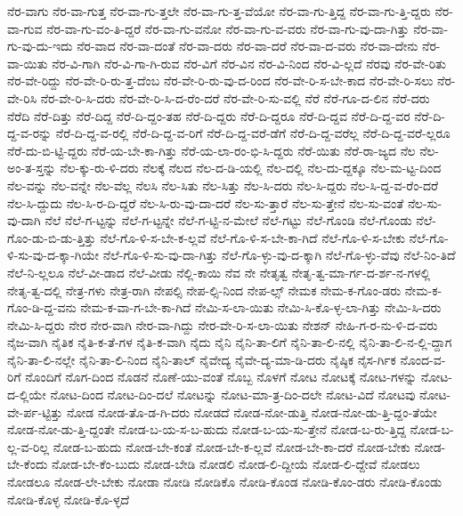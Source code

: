 {ನೆರ-ವಾಗು
ನೆರ-ವಾ-ಗುತ್ತ
ನೆರ-ವಾ-ಗು-ತ್ತಲೇ
ನೆರ-ವಾ-ಗು-ತ್ತ-ವೆಯೋ
ನೆರ-ವಾ-ಗು-ತ್ತಿದ್ದ
ನೆರ-ವಾ-ಗು-ತ್ತಿ-ದ್ದರು
ನೆರ-ವಾ-ಗುವ
ನೆರ-ವಾ-ಗು-ವಂ-ತಿ-ದ್ದರೆ
ನೆರ-ವಾ-ಗು-ವನೋ
ನೆರ-ವಾ-ಗು-ವ-ವರು
ನೆರ-ವಾ-ಗು-ವು-ದಾ-ಗಿತ್ತು
ನೆರ-ವಾ-ಗು-ವು-ದು-ಇದು
ನೆರ-ವಾದ
ನೆರ-ವಾ-ದಂತೆ
ನೆರ-ವಾ-ದರು
ನೆರ-ವಾ-ದರೆ
ನೆರ-ವಾ-ದ-ವರು
ನೆರ-ವಾ-ದೇನು
ನೆರ-ವಾ-ಯಿತು
ನೆರ-ವಿ-ಗಾಗಿ
ನೆರ-ವಿ-ಗಾ-ಗಿ-ರುವ
ನೆರ-ವಿಗೆ
ನೆರ-ವಿನ
ನೆರ-ವಿ-ನಿಂದ
ನೆರ-ವಿ-ಲ್ಲದೆ
ನೆರವು
ನೆರ-ವೇ-ರಿತು
ನೆರ-ವೇ-ರಿದ್ದು
ನೆರ-ವೇ-ರಿ-ರು-ತ್ತ-ದೆಂಬ
ನೆರ-ವೇ-ರಿ-ರು-ವು-ದ-ರಿಂದ
ನೆರ-ವೇ-ರಿ-ಸ-ಬೇ-ಕಾದ
ನೆರ-ವೇ-ರಿ-ಸಲು
ನೆರ-ವೇ-ರಿಸಿ
ನೆರ-ವೇ-ರಿ-ಸಿ-ದರು
ನೆರ-ವೇ-ರಿ-ಸಿ-ದ-ರೆಂ-ದರೆ
ನೆರ-ವೇ-ರಿ-ಸು-ವಲ್ಲಿ
ನೆರೆ
ನೆರೆ-ಗೂ-ದ-ಲಿನ
ನೆರೆ-ದರು
ನೆರೆದಿ
ನೆರೆ-ದಿತ್ತು
ನೆರೆ-ದಿದ್ದ
ನೆರೆ-ದಿ-ದ್ದಂ-ತಹ
ನೆರೆ-ದಿ-ದ್ದರು
ನೆರೆ-ದಿ-ದ್ದರೂ
ನೆರೆ-ದಿ-ದ್ದವ
ನೆರೆ-ದಿ-ದ್ದ-ವರ
ನೆರೆ-ದಿ-ದ್ದ-ವ-ರನ್ನು
ನೆರೆ-ದಿ-ದ್ದ-ವ-ರಲ್ಲಿ
ನೆರೆ-ದಿ-ದ್ದ-ವ-ರಿಗೆ
ನೆರೆ-ದಿ-ದ್ದ-ವರೆ-ಡೆಗೆ
ನೆರೆ-ದಿ-ದ್ದ-ವರೆಲ್ಲ
ನೆರೆ-ದಿ-ದ್ದ-ವರೆ-ಲ್ಲರೂ
ನೆರೆ-ದು-ಬಿ-ಟ್ಟಿ-ದ್ದರು
ನೆರೆ-ಯ-ಬೇ-ಕಾ-ಗಿತ್ತು
ನೆರೆ-ಯ-ಲಾ-ರಂ-ಭಿ-ಸಿ-ದ್ದರು
ನೆರೆ-ಯಿತು
ನೆರೆ-ರಾ-ಜ್ಯದ
ನೆಲ
ನೆಲ-ಅಂ-ತ-ಸ್ತನ್ನು
ನೆಲ-ಕ್ಕು-ರು-ಳಿ-ದರು
ನೆಲಕ್ಕೆ
ನೆಲದ
ನೆಲ-ದ-ಡಿ-ಯಲ್ಲಿ
ನೆಲ-ದಲ್ಲಿ
ನೆಲ-ದು-ದ್ದಕ್ಕೂ
ನೆಲ-ಮ-ಟ್ಟ-ದಿಂದ
ನೆಲ-ವನ್ನು
ನೆಲ-ವನ್ನೇ
ನೆಲ-ವೆಲ್ಲ
ನೆಲಸಿ
ನೆಲ-ಸಿತು
ನೆಲ-ಸಿತ್ತು
ನೆಲ-ಸಿ-ದರು
ನೆಲ-ಸಿ-ದ್ದರು
ನೆಲ-ಸಿ-ದ್ದ-ವ-ರೆಂ-ದರೆ
ನೆಲ-ಸಿ-ದ್ದುದು
ನೆಲ-ಸಿ-ರ-ದಿ-ದ್ದರೆ
ನೆಲ-ಸಿ-ರು-ವು-ದಾ-ದರೆ
ನೆಲ-ಸು-ತ್ತಾರೆ
ನೆಲ-ಸು-ತ್ತೇನೆ
ನೆಲ-ಸು-ವಂತೆ
ನೆಲ-ಸು-ವು-ದಾಗಿ
ನೆಲೆ
ನೆಲೆ-ಗ-ಟ್ಟನ್ನು
ನೆಲೆ-ಗ-ಟ್ಟನ್ನೇ
ನೆಲೆ-ಗ-ಟ್ಟಿ-ನ-ಮೇಲೆ
ನೆಲೆ-ಗಟ್ಟು
ನೆಲೆ-ಗೊಂಡಿ
ನೆಲೆ-ಗೊಂಡು
ನೆಲೆ-ಗೊಂ-ಡು-ಬಿ-ಡು-ತ್ತಿತ್ತು
ನೆಲೆ-ಗೊ-ಳಿ-ಸ-ಬೇ-ಕ-ಲ್ಲವೆ
ನೆಲೆ-ಗೊ-ಳಿ-ಸ-ಬೇ-ಕಾ-ಗಿದೆ
ನೆಲೆ-ಗೊ-ಳಿ-ಸ-ಬೇಕು
ನೆಲೆ-ಗೊ-ಳಿ-ಸು-ವು-ದ-ಕ್ಕಾ-ಗಿಯೇ
ನೆಲೆ-ಗೊ-ಳಿ-ಸು-ವು-ದಾ-ಗಿತ್ತು
ನೆಲೆ-ಗೊ-ಳ್ಳು-ವು-ದ-ಕ್ಕಾಗಿ
ನೆಲೆ-ಗೊ-ಳ್ಳು-ವೆವು
ನೆಲೆ-ನಿಂ-ತಿದೆ
ನೆಲೆ-ನಿ-ಲ್ಲಲೂ
ನೆಲೆ-ವೀ-ಡಾದ
ನೆಲೆ-ವೀಡು
ನೆಲ್ಲಿ-ಕಾಯಿ
ನೆವ
ನೇ
ನೇತೃತ್ವ
ನೇತೃ-ತ್ವ-ಮಾ-ರ್ಗ-ದ-ರ್ಶ-ನ-ಗಳಲ್ಲಿ
ನೇತೃ-ತ್ವ-ದಲ್ಲಿ
ನೇತ್ರ-ಗಳು
ನೇತ್ರ-ರಾಗಿ
ನೇಪಲ್ಸಿ
ನೇಪ-ಲ್ಸಿ-ನಿಂದ
ನೇಪ-ಲ್ಸ್
ನೇಮಕ
ನೇಮ-ಕ-ಗೊಂ-ಡರು
ನೇಮ-ಕ-ಗೊಂ-ಡಿ-ದ್ದ-ವನು
ನೇಮ-ಕ-ವಾ-ಗ-ಬೇ-ಕಾ-ಗಿದೆ
ನೇಮಿ-ಸ-ಲಾ-ಯಿತು
ನೇಮಿ-ಸಿ-ಕೊ-ಳ್ಳ-ಲಾ-ಗಿತ್ತು
ನೇಮಿ-ಸಿ-ದರು
ನೇಮಿ-ಸಿ-ದ್ದರು
ನೇರ
ನೇರ-ವಾಗಿ
ನೇರ-ವಾ-ಗಿದ್ದು
ನೇರ-ವೇ-ರಿ-ಸ-ಲಾ-ಯಿತು
ನೇಶನ್
ನೇಹಿ-ಗ-ರ-ನು-ಳಿ-ದ-ವರು
ನೈಜ-ವಾಗಿ
ನೈತಿಕ
ನೈತಿ-ಕ-ತೆ-ಗಳ
ನೈತಿ-ಕ-ವಾಗಿ
ನೈದು
ನೈನಿ
ನೈನಿ-ತಾ-ಲಿಗೆ
ನೈನಿ-ತಾ-ಲಿ-ನಲ್ಲಿ
ನೈನಿ-ತಾ-ಲಿ-ನ-ಲ್ಲಿ-ದ್ದಾಗ
ನೈನಿ-ತಾ-ಲಿ-ನಲ್ಲೇ
ನೈನಿ-ತಾ-ಲಿ-ನಿಂದ
ನೈನಿ-ತಾಲ್
ನೈವೇದ್ಯ
ನೈವೇ-ದ್ಯ-ಮಾ-ಡಿ-ದರು
ನೈಷ್ಠಿಕ
ನೈಸ-ರ್ಗಿಕ
ನೊಂದ-ವ-ರಿಗೆ
ನೊಂದಿಗೆ
ನೊಗ-ದಿಂದ
ನೊಡನೆ
ನೊಣೆ-ಯು-ವಂತೆ
ನೊಬ್ಬ
ನೊಳಗೆ
ನೋಟ
ನೋಟಕ್ಕೆ
ನೋಟ-ಗಳನ್ನು
ನೋಟ-ದ-ಲ್ಲಿಯೇ
ನೋಟ-ದಿಂದ
ನೋಟ-ದಿಂ-ದಲೆ
ನೋಟನ್ನು
ನೋಟ-ಮಾ-ತ್ರ-ದಿಂ-ದಲೇ
ನೋಟ-ವಿದೆ
ನೋಟವು
ನೋಟ-ವೇ-ರ್ಪ-ಟ್ಟಿತ್ತು
ನೋಡ
ನೋಡ-ತೊ-ಡ-ಗಿ-ದರು
ನೋಡದೆ
ನೋಡ-ನೋ-ಡುತ್ತಿ
ನೋಡ-ನೋ-ಡು-ತ್ತಿ-ದ್ದಂ-ತೆಯೇ
ನೋಡ-ನೋ-ಡು-ತ್ತಿ-ದ್ದಂತೇ
ನೋಡ-ಬ-ಯ-ಸ-ಬ-ಹುದು
ನೋಡ-ಬ-ಯ-ಸು-ತ್ತೇನೆ
ನೋಡ-ಬ-ರು-ತ್ತಿದ್ದ
ನೋಡ-ಬ-ಲ್ಲ-ವ-ರಿಲ್ಲ
ನೋಡ-ಬ-ಹುದು
ನೋಡ-ಬೇ-ಕಂತೆ
ನೋಡ-ಬೇ-ಕ-ಲ್ಲವೆ
ನೋಡ-ಬೇ-ಕಾ-ದರೆ
ನೋಡ-ಬೇಕು
ನೋಡ-ಬೇ-ಕೆಂದು
ನೋಡ-ಬೇ-ಕೆಂ-ಬುದು
ನೋಡ-ಬೇಡಿ
ನೋಡಲಿ
ನೋಡ-ಲಿ-ದ್ದೀಯೆ
ನೋಡ-ಲಿ-ದ್ದೇವೆ
ನೋಡಲು
ನೋಡಲೂ
ನೋಡ-ಲೇ-ಬೇಕು
ನೋಡಾ
ನೋಡಿ
ನೋಡಿಕೊ
ನೋಡಿ-ಕೊಂಡ
ನೋಡಿ-ಕೊಂ-ಡರು
ನೋಡಿ-ಕೊಂಡು
ನೋಡಿ-ಕೊಳ್ಳ
ನೋಡಿ-ಕೊ-ಳ್ಳದೆ
}
